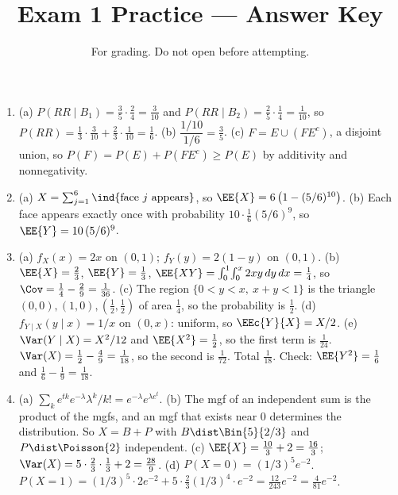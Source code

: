 \documentclass[11pt]{article}
\title{Exam 1 Practice --- Answer Key}
\author{For grading. Do not open before attempting.}
\date{}
\begin{document}
\maketitle

\begin{enumerate}
  \item[\textbf{1.}]
    (a) $P(RR \mid B_1) = \tfrac35\cdot\tfrac24 = \tfrac{3}{10}$ and
    $P(RR \mid B_2) = \tfrac25\cdot\tfrac14 = \tfrac{1}{10}$, so
    $P(RR) = \tfrac13\cdot\tfrac{3}{10} + \tfrac23\cdot\tfrac{1}{10} = \tfrac16$.
    (b) $\dfrac{1/10}{1/6} = \tfrac35$.
    (c) $F = E \cup (F E^c)$, a disjoint union, so
    $P(F) = P(E) + P(FE^c) \ge P(E)$ by additivity and nonnegativity.

  \item[\textbf{2.}]
    (a) $X = \sum_{j=1}^6 \ind{\text{face } j \text{ appears}}$, so
    $\EE{X} = 6\left(1 - (5/6)^{10}\right)$.
    (b) Each face appears exactly once with probability
    $10\cdot\tfrac16(5/6)^{9}$, so $\EE{Y} = 10\,(5/6)^{9}$.

  \item[\textbf{3.}]
    (a) $f_X(x) = 2x$ on $(0,1)$; $f_Y(y) = 2(1-y)$ on $(0,1)$.
    (b) $\EE{X} = \tfrac23$, $\EE{Y} = \tfrac13$,
    $\EE{XY} = \int_0^1\!\int_0^x 2xy\,dy\,dx = \tfrac14$, so
    $\Cov = \tfrac14 - \tfrac29 = \tfrac{1}{36}$.
    (c) The region $\{0<y<x,\ x+y<1\}$ is the triangle $(0,0),(1,0),(\tfrac12,\tfrac12)$
    of area $\tfrac14$, so the probability is $\tfrac12$.
    (d) $f_{Y\mid X}(y \mid x) = 1/x$ on $(0,x)$: uniform, so $\EEc{Y}{X} = X/2$.
    (e) $\Var(Y\mid X) = X^2/12$ and $\EE{X^2} = \tfrac12$, so the first term is
    $\tfrac{1}{24}$. $\Var(X) = \tfrac12 - \tfrac49 = \tfrac{1}{18}$, so the second is
    $\tfrac{1}{72}$. Total $\tfrac{1}{18}$. Check: $\EE{Y^2} = \tfrac16$ and
    $\tfrac16 - \tfrac19 = \tfrac{1}{18}$.

  \item[\textbf{4.}]
    (a) $\sum_k e^{tk} e^{-\lambda}\lambda^k/k! = e^{-\lambda} e^{\lambda e^t}$.
    (b) The mgf of an independent sum is the product of the mgfs, and an mgf that
    exists near $0$ determines the distribution. So $X = B + P$ with
    $B \dist \Bin{5}{2/3}$ and $P \dist \Poisson{2}$ independent.
    (c) $\EE{X} = \tfrac{10}{3} + 2 = \tfrac{16}{3}$;
    $\Var(X) = 5\cdot\tfrac23\cdot\tfrac13 + 2 = \tfrac{28}{9}$.
    (d) $P(X=0) = (1/3)^5 e^{-2}$.
    $P(X=1) = (1/3)^5\cdot 2e^{-2} + 5\cdot\tfrac23(1/3)^4\cdot e^{-2}
    = \tfrac{12}{243}e^{-2} = \tfrac{4}{81}e^{-2}$.


\end{enumerate}
\end{document}
